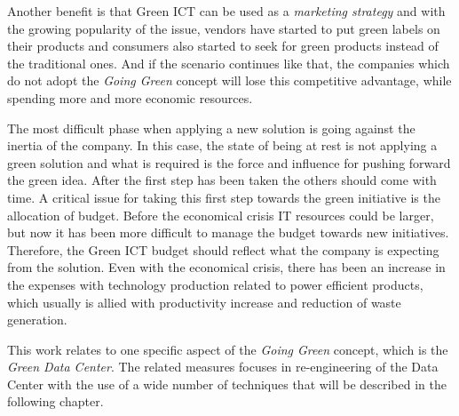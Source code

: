     Another benefit is that Green ICT can be used as a \emph{marketing strategy} and with the growing popularity of the issue, vendors have started to put green labels on their products and consumers also started to seek for green products instead of the traditional ones. And if the scenario continues like that, the companies which do not adopt the \emph{Going Green} concept will lose this competitive advantage, while spending more and more economic resources.
    
    The most difficult phase when applying a new solution is going against the inertia of the company. In this case, the state of being at rest is not applying a green solution and what is required is the force and influence for pushing forward the green idea. After the first step has been taken the others should come with time. A critical issue for taking this first step towards the green initiative is the allocation of budget. Before the economical crisis IT resources could be larger, but now it has been more difficult to manage the budget towards new initiatives. Therefore, the Green ICT budget should reflect what the company is expecting from the solution. Even with the economical crisis, there has been an increase in the expenses with technology production related to power efficient products, which usually is allied with productivity increase and reduction of waste generation. 
    
        This work relates to one specific aspect of the \emph{Going Green} concept, which is the \emph{Green Data Center}. The related measures focuses in re-engineering of the Data Center with the use of a wide number of techniques that will be described in the following chapter.




